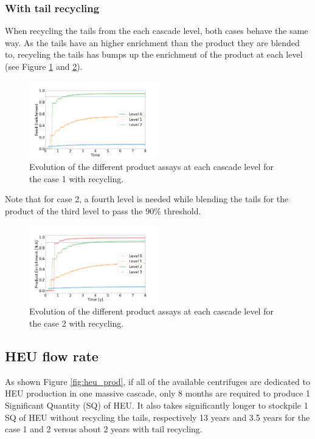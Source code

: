 \documentclass{anstrans}
\begin{document}
\subsubsection{With tail recycling}
When recycling the tails from the each cascade level, both cases behave
the same way. As the tails have an higher enrichment than the product they are
blended to, recycling the tails has bumps up the enrichment of the
product at each level (see Figure \ref{fig:assay_c1_r} and \ref{fig:assay_c2_r}).

\begin{figure}[ht] %
  \centering
  \includegraphics[width=0.5\textwidth]{assay_case_1_rec.png}
  \caption{Evolution of the different product assays at each cascade level for
  the case 1 with recycling. }\label{fig:assay_c1_r}
\end{figure}

Note that for case 2, a fourth level is needed while blending the tails for the
product of the third level to pass the $90\%$ threshold.

\begin{figure}[ht] %
  \centering
  \includegraphics[width=0.5\textwidth]{assay_case_2_rec.png}
  \caption{Evolution of the different product assays at each cascade level for
  the case 2 with recycling.}\label{fig:assay_c2_r}
\end{figure}


\subsection{HEU flow rate}
As shown Figure \ref{fig:heu_prod}, if all of the available centrifuges are
dedicated to HEU production in one massive cascade, only 8 months are required
to produce 1 Significant Quantity (SQ) of HEU. It also takes significantly
longer to stockpile 1 SQ of HEU without recycling the tails, respectively 13
years and 3.5 years for the case 1 and 2 versus about 2 years with tail
recycling.
\end{document}

